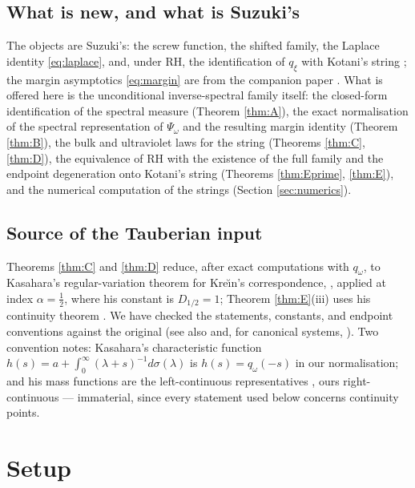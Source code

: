 \documentclass[11pt,reqno]{amsart}
\theoremstyle{plain}
\theoremstyle{definition}
\begin{document}
\subsection{What is new, and what is Suzuki's}
The objects are Suzuki's: the screw function, the shifted family, the Laplace identity
\eqref{eq:laplace}, and, under RH, the identification of $q_\xi$ with Kotani's string
\cite[\S9]{Suzuki2023}; the margin asymptotics \eqref{eq:margin} are from the companion paper
\cite{Margin}. What is offered here is the unconditional inverse-spectral family itself:
the closed-form identification of the spectral measure (Theorem \ref{thm:A}), the exact
normalisation of the spectral representation of $\Psi_\omega$ and the resulting margin identity
(Theorem \ref{thm:B}), the bulk and ultraviolet laws for the string (Theorems \ref{thm:C},
\ref{thm:D}), the equivalence of RH with the existence of the full family and the endpoint
degeneration onto Kotani's string (Theorems \ref{thm:Eprime}, \ref{thm:E}), and the numerical
computation of the strings (Section \ref{sec:numerics}).

\subsection*{Source of the Tauberian input}
Theorems \ref{thm:C} and \ref{thm:D} reduce, after exact computations with $q_\omega$, to
Kasahara's regular-variation theorem for Kre\u\i n's correspondence,
\cite[Thm.~2 and Example~1]{Kasahara}, applied at index $\alpha=\tfrac12$, where his constant
is $D_{1/2}=1$; Theorem \ref{thm:E}(iii) uses his continuity theorem \cite[Thm.~1]{Kasahara}.
We have checked the statements, constants, and endpoint conventions against the original (see
also \cite{KotaniWatanabe,KasaharaWatanabe2009,KasaharaWatanabe2010} and, for canonical
systems, \cite{EKT}). Two convention notes: Kasahara's characteristic function
$h(s)=a+\int_0^\infty(\lambda+s)^{-1}d\sigma(\lambda)$ \cite[(5),(7)]{Kasahara} is
$h(s)=q_\omega(-s)$ in our normalisation; and his mass functions are the left-continuous
representatives \cite[\S1]{Kasahara}, ours right-continuous --- immaterial, since every
statement used below concerns continuity points.

\section{Setup}\label{sec:setup}
\end{document}
